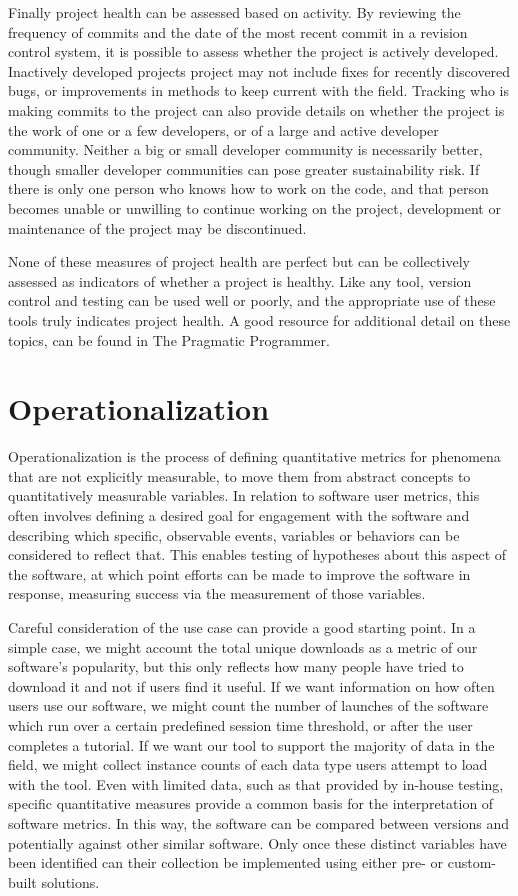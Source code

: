 \documentclass{article}
\begin{document}
Finally project health can be assessed based on activity. By reviewing the frequency of commits and the date of the most recent commit in a revision control system, it is possible to assess whether the project is actively developed. Inactively developed projects project may not include fixes for recently discovered bugs, or improvements in methods to keep current with the field. Tracking who is making commits to the project can also provide details on whether the project is the work of one or a few developers, or of a large and active developer community. Neither a big or small developer community is necessarily better, though smaller developer communities can pose greater sustainability risk. If there is only one person who knows how to work on the code, and that person becomes unable or unwilling to continue working on the project, development or maintenance of the project may be discontinued. 

None of these measures of project health are perfect but can be collectively assessed as indicators of whether a project is healthy. Like any tool, version control and testing can be used well or poorly, and the appropriate use of these tools truly indicates project health. A good resource for additional detail on these topics, can be found in The Pragmatic Programmer\cite{thomas_pragmatic_2019}. 

\section{Operationalization}

Operationalization is the process of defining quantitative metrics for phenomena that are not explicitly measurable, to move them from abstract concepts to quantitatively measurable variables. In relation to software user metrics, this often involves defining a desired goal for engagement with the software and describing which specific, observable events, variables or behaviors can be considered to reflect that. This enables testing of hypotheses about this aspect of the software, at which point efforts can be made to improve the software in response, measuring success via the measurement of those variables. 

Careful consideration of the use case can provide a good starting point. In a simple case, we might account the total unique downloads as a metric of our software’s popularity, but this only reflects how many people have tried to download it and not if users find it useful. If we want information on how often users use our software, we might count the number of launches of the software which run over a certain predefined session time threshold, or after the user completes a tutorial. If we want our tool to support the majority of data in the field, we might collect instance counts of each data type users attempt to load with the tool. Even with limited data, such as that provided by in-house testing, specific quantitative measures provide a common basis for the interpretation of software metrics. In this way, the software can be compared between versions and potentially against other similar software. Only once these distinct variables have been identified can their collection be implemented using either pre- or custom-built solutions.
\end{document}
